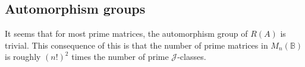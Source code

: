 \documentclass[11pt]{article}
\numberwithin{equation}{section}
\newcommand{\B}{\mathbb{B}}
\newcommand{\Bn}{M_n(\B)}
\newcommand{\J}{\mathscr{J}}
\begin{document}
\subsection*{Automorphism groups}
It seems that for most prime matrices, the automorphism group of $R(A)$ is trivial. This consequence of this is that the number of prime matrices in $\Bn$ is roughly $(n!)^2$ times the number of prime $\J$-classes.

\printbibliography
\end{document}
